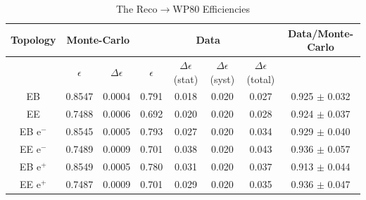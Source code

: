 \begin{table}
\begin{center}
\begin{minipage}{15cm}
\begin{tabular}{c|cc|cccc|c}
    \end{tabular}
    \end{minipage}
  \end{center}
\end{table}
\begin{table}
  \begin{center}
    \caption{The Reco$\to$WP80 Efficiencies}
    \label{tab:recoWP80Results}
    \vskip 2mm
    \begin{tabular}{c|cc|cccc|c}\hline \hline
      Topology &   \multicolumn{2}{c|}{Monte-Carlo} & \multicolumn{4}{c|}{Data} & Data/Monte-Carlo \\ \hline
               &   $\epsilon$ &  $\Delta\epsilon$  & $\epsilon$ & $\Delta\epsilon$ (stat) & $\Delta\epsilon$ (syst) & $\Delta\epsilon$ (total) &   \\ \hline
      EB       &   0.8547     & 0.0004             & 0.791      & 0.018                   & 0.020                   & 0.027                    & 0.925 $\pm$ 0.032 \\ 
      EE       &   0.7488     & 0.0006             & 0.692      & 0.020                   & 0.020                   & 0.028                    & 0.924 $\pm$ 0.037 \\
   EB e$^{-}$  &   0.8545     & 0.0005             & 0.793      & 0.027                   & 0.020                   & 0.034                    & 0.929 $\pm$ 0.040 \\
   EE e$^{-}$  &   0.7489     & 0.0009             & 0.701      & 0.038                   & 0.020                   & 0.043                    & 0.936 $\pm$ 0.057 \\
   EB e$^{+}$  &   0.8549     & 0.0005             & 0.780      & 0.031                   & 0.020                   & 0.037                    & 0.913 $\pm$ 0.044 \\
   EE e$^{+}$  &   0.7487     & 0.0009             & 0.701      & 0.029                   & 0.020                   & 0.035                    & 0.936 $\pm$ 0.047 \\ \hline
    \end{tabular}
  \end{center}
\end{table}
